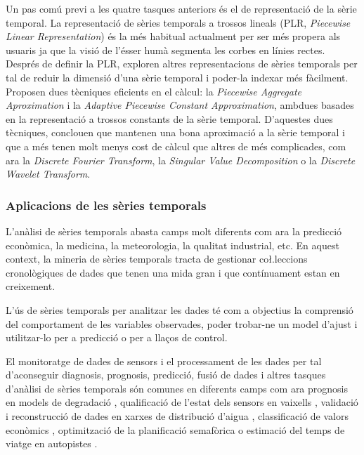 Un pas comú previ a les quatre tasques anteriors és el de representació de la sèrie temporal. 
La representació de sèries temporals a trossos lineals (PLR, \emph{Piecewise Linear Representation}) \parencite{keogh97,keogh98} {é}s la més habitual actualment per ser més propera als usuaris ja que la visió de l'ésser humà segmenta les corbes en línies rectes.
Després de definir la PLR, \textcite{keogh00,keogh01} exploren altres representacions de sèries temporals per tal de reduir la dimensió d'una sèrie temporal i poder-la indexar més fàcilment. Proposen dues tècniques eficients en el càlcul: la \emph{Piecewise Aggregate Aproximation} i la \emph{Adaptive Piecewise Constant Approximation}, ambdues basades en la representació a trossos constants de la sèrie temporal. 
D'aquestes dues tècniques, \citeauthor{keogh00,keogh01} conclouen que mantenen una bona aproximació a la sèrie temporal i que a més  tenen molt menys cost de càlcul que altres de més complicades, com ara la \emph{Discrete Fourier Transform},  la  \emph{Singular Value Decomposition} o la \emph{Discrete Wavelet Transform}.




\subsubsection{Aplicacions de les sèries temporals}

L'anàlisi de sèries temporals abasta camps molt diferents com ara la predicció econòmica, la medicina, la meteorologia, la qualitat industrial, etc. En aquest context,  la mineria de sèries temporals tracta de gestionar co\l.leccions cronològiques de dades que tenen una mida gran i que contínuament estan en creixement.


L'ús de sèries temporals per analitzar les dades té com a objectius la comprensió del comportament de les variables observades, poder trobar-ne un model d'ajust i utilitzar-lo per a predicció o per a llaços de control.


El monitoratge de dades de sensors i el processament de les dades per tal d'aconseguir diagnosis, prognosis, predicció, fusió de dades i altres tasques d'anàlisi de sèries temporals són comunes en diferents camps com ara prognosis en models de degradació \parencite{yu11}, qualificació de l'estat dels sensors en vaixells \parencite{palmer07}, validació i reconstrucció de dades en xarxes de distribució d'aigua \parencite{quevedo10}, classificació de valors econòmics \parencite{dreyer95}, optimització de la planificació semafòrica \parencite{last11} o estimació del temps de viatge en autopistes \parencite{soriguera10}.



